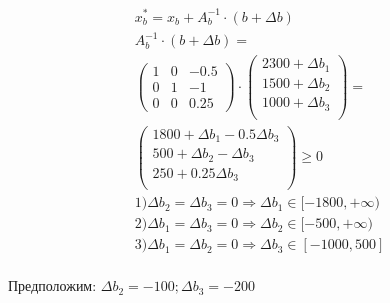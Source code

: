 \documentclass[17pt]{extarticle}
\begin{document}
\[
    \begin{split}
        x^*_b = x_b + A^{-1}_b \cdot (b + \Delta b) \\
        A^{-1}_b \cdot (b + \Delta b) = \\
        \begin{pmatrix}
            1 & 0 & -0.5 \\
            0 & 1 & -1   \\
            0 & 0 & 0.25
        \end{pmatrix}
        \cdot
        \begin{pmatrix}
            2300 + \Delta b_1 \\
            1500 + \Delta b_2 \\
            1000 + \Delta b_3 \\
        \end{pmatrix}
        = \\
        \begin{pmatrix}
            1800 + \Delta b_1 - 0.5 \Delta b_3 \\
            500 + \Delta b_2 - \Delta b_3      \\
            250 + 0.25 \Delta b_3              \\
        \end{pmatrix} \geq 0 \\
        1) \Delta b_2 = \Delta b_3 = 0 \Rightarrow \Delta b_1 \in [-1800, +\infty) \\
        2) \Delta b_1 = \Delta b_3 = 0 \Rightarrow \Delta b_2 \in [-500, +\infty) \\
        3) \Delta b_1 = \Delta b_2 = 0 \Rightarrow \Delta b_3 \in [-1000, 500] \\
    \end{split}
\]

Предположим: \(\Delta b_2 = -100; \Delta b_3 = -200\)
\end{document}

